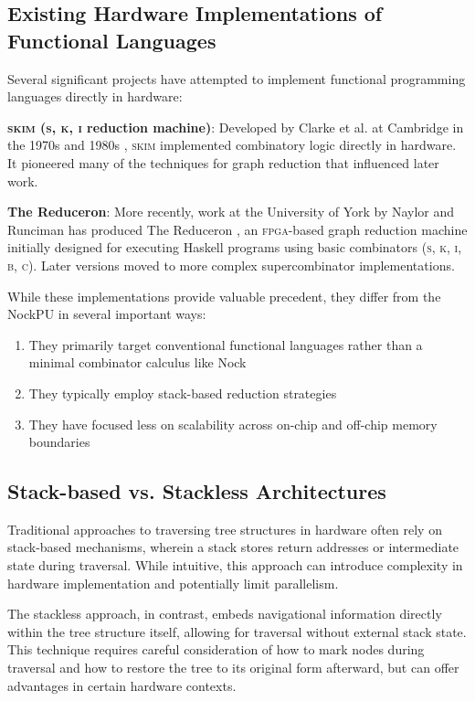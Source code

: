 \documentclass[twoside]{article}
\begin{document}
\subsection{Existing Hardware Implementations of Functional Languages}

Several significant projects have attempted to implement functional programming languages directly in hardware:

\textbf{\textsc{skim} (\textsc{s}, \textsc{k}, \textsc{i} reduction machine)}: Developed by Clarke et al. at Cambridge in the 1970s and 1980s \citep{Clarke1980, Norman1984}, \textsc{skim} implemented combinatory logic directly in hardware. It pioneered many of the techniques for graph reduction that influenced later work.

\textbf{The Reduceron}: More recently, work at the University of York by Naylor and Runciman has produced The Reduceron \citep{Naylor2008, Naylor2009}, an \textsc{fpga}-based graph reduction machine initially designed for executing Haskell programs using basic combinators (\textsc{s}, \textsc{k}, \textsc{i}, \textsc{b}, \textsc{c}). Later versions moved to more complex supercombinator implementations.

While these implementations provide valuable precedent, they differ from the NockPU in several important ways:
\begin{enumerate}
  \item They primarily target conventional functional languages rather than a minimal combinator calculus like Nock
  \item They typically employ stack-based reduction strategies
  \item They have focused less on scalability across on-chip and off-chip memory boundaries
\end{enumerate}

\subsection{Stack-based vs. Stackless Architectures}

Traditional approaches to traversing tree structures in hardware often rely on stack-based mechanisms, wherein a stack stores return addresses or intermediate state during traversal. While intuitive, this approach can introduce complexity in hardware implementation and potentially limit parallelism.

The stackless approach, in contrast, embeds navigational information directly within the tree structure itself, allowing for traversal without external stack state. This technique requires careful consideration of how to mark nodes during traversal and how to restore the tree to its original form afterward, but can offer advantages in certain hardware contexts.
\end{document}
